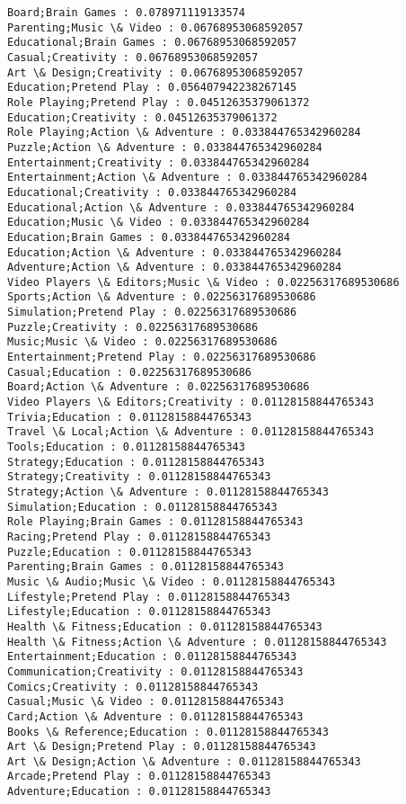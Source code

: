 \documentclass[11pt]{article}
\begin{document}
\begin{Verbatim}[commandchars=\\\{\}]
Board;Brain Games : 0.078971119133574
Parenting;Music \& Video : 0.06768953068592057
Educational;Brain Games : 0.06768953068592057
Casual;Creativity : 0.06768953068592057
Art \& Design;Creativity : 0.06768953068592057
Education;Pretend Play : 0.056407942238267145
Role Playing;Pretend Play : 0.04512635379061372
Education;Creativity : 0.04512635379061372
Role Playing;Action \& Adventure : 0.033844765342960284
Puzzle;Action \& Adventure : 0.033844765342960284
Entertainment;Creativity : 0.033844765342960284
Entertainment;Action \& Adventure : 0.033844765342960284
Educational;Creativity : 0.033844765342960284
Educational;Action \& Adventure : 0.033844765342960284
Education;Music \& Video : 0.033844765342960284
Education;Brain Games : 0.033844765342960284
Education;Action \& Adventure : 0.033844765342960284
Adventure;Action \& Adventure : 0.033844765342960284
Video Players \& Editors;Music \& Video : 0.02256317689530686
Sports;Action \& Adventure : 0.02256317689530686
Simulation;Pretend Play : 0.02256317689530686
Puzzle;Creativity : 0.02256317689530686
Music;Music \& Video : 0.02256317689530686
Entertainment;Pretend Play : 0.02256317689530686
Casual;Education : 0.02256317689530686
Board;Action \& Adventure : 0.02256317689530686
Video Players \& Editors;Creativity : 0.01128158844765343
Trivia;Education : 0.01128158844765343
Travel \& Local;Action \& Adventure : 0.01128158844765343
Tools;Education : 0.01128158844765343
Strategy;Education : 0.01128158844765343
Strategy;Creativity : 0.01128158844765343
Strategy;Action \& Adventure : 0.01128158844765343
Simulation;Education : 0.01128158844765343
Role Playing;Brain Games : 0.01128158844765343
Racing;Pretend Play : 0.01128158844765343
Puzzle;Education : 0.01128158844765343
Parenting;Brain Games : 0.01128158844765343
Music \& Audio;Music \& Video : 0.01128158844765343
Lifestyle;Pretend Play : 0.01128158844765343
Lifestyle;Education : 0.01128158844765343
Health \& Fitness;Education : 0.01128158844765343
Health \& Fitness;Action \& Adventure : 0.01128158844765343
Entertainment;Education : 0.01128158844765343
Communication;Creativity : 0.01128158844765343
Comics;Creativity : 0.01128158844765343
Casual;Music \& Video : 0.01128158844765343
Card;Action \& Adventure : 0.01128158844765343
Books \& Reference;Education : 0.01128158844765343
Art \& Design;Pretend Play : 0.01128158844765343
Art \& Design;Action \& Adventure : 0.01128158844765343
Arcade;Pretend Play : 0.01128158844765343
Adventure;Education : 0.01128158844765343

    \end{Verbatim}
\end{document}
